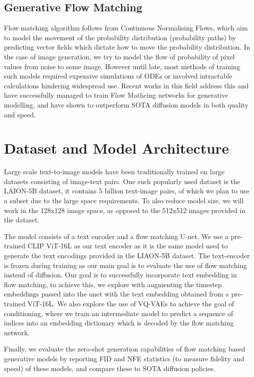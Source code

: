 \documentclass[12pt]{article}
\begin{document}
\subsection{Generative Flow Matching}
Flow matching algorithm follows from Continuous Normalising Flows, which aim to model the movement of the probability distribution (probability paths) by predicting vector fields which dictate how to move the probability distribution. In the case of image generation, we try to model the flow of probability of pixel values from noise to some image. However until late, most methods of training such models required expensive simulations of ODEs or involved intractable calculations hindering widespread use. Recent works in this field address this and have successfully managed to train Flow Mathcing networks for generative modelling, and have shown to outperform SOTA diffusion models in both quality and speed.~\cite{lipman2023flow}

\section{Dataset and Model Architecture}
Large scale text-to-image models have been traditionally trained on large datasets consisting of image-text pairs. One such popularly used dataset is the LAION-5B dataset, it contains 5 billion text-image pairs, of which we plan to use a subset due to the large space requirements. To also reduce model size, we will work in the 128x128 image space, as opposed to the 512x512 images provided in the dataset.

The model consists of a text encoder and a flow matching U-net. We use a pre-trained CLIP ViT-16L as our text encoder as it is the same model used to generate the text encodings provided in the LIAON-5B dataset. The text-encoder is frozen during training as our main goal is to evaluate the use of flow matching instead of diffusion. Our goal is to successfully incorporate text embedding in flow matching, to achieve this, we explore with augmenting the timestep embeddings passed into the unet with the text embedding obtained from a pre-trained ViT-16L. We also explore the use of VQ-VAEs to achieve the goal of conditioning, where we train an intermediate model to predict a sequence of indices into an embedding dictionary which is decoded by the flow matching network.

Finally, we evaluate the zero-shot generation capabilities of flow matching based generative models by reporting FID and NFE statistics (to measure fidelity and speed) of these models, and compare these to SOTA diffusion policies.



\end{document}
